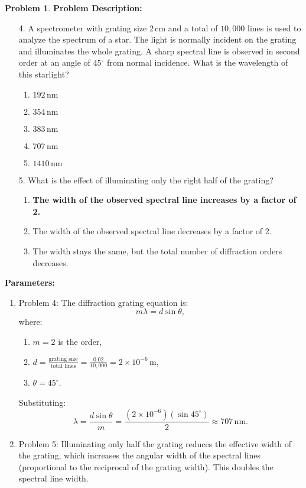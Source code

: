 \documentclass[12pt]{article}
\theoremstyle{definition} %
\newtheorem{problem}{Problem}
\theoremstyle{plain} %
\begin{document}
\begin{problem}
    
\textbf{Problem Description:}

\begin{enumerate}
    \item[4.] A spectrometer with grating size \(2 \, \text{cm}\) and a total of \(10,000\) lines is used to analyze the spectrum of a star. The light is normally incident on the grating and illuminates the whole grating. A sharp spectral line is observed in second order at an angle of \(45^\circ\) from normal incidence. What is the wavelength of this starlight?
    \begin{enumerate}
        \item \(192 \, \text{nm}\)
        \item \(354 \, \text{nm}\)
        \item \(383 \, \text{nm}\)
        \item \textbf{\(707 \, \text{nm}\)}
        \item \(1410 \, \text{nm}\)
    \end{enumerate}

    \item[5.] What is the effect of illuminating only the right half of the grating?
    \begin{enumerate}
        \item \textbf{The width of the observed spectral line increases by a factor of 2.}
        \item The width of the observed spectral line decreases by a factor of 2.
        \item The width stays the same, but the total number of diffraction orders decreases.
    \end{enumerate}
\end{enumerate}

\textbf{Parameters:}
\begin{enumerate}
    \item Problem 4: The diffraction grating equation is:
    $$
    m\lambda = d\sin\theta,
    $$
    where:
    \begin{enumerate}
        \item \(m = 2\) is the order,
        \item \(d = \frac{\text{grating size}}{\text{total lines}} = \frac{0.02}{10,000} = 2 \times 10^{-6} \, \text{m}\),
        \item \(\theta = 45^\circ\).
    \end{enumerate}
    Substituting:
    $$
    \lambda = \frac{d\sin\theta}{m} = \frac{(2 \times 10^{-6})(\sin 45^\circ)}{2} \approx 707 \, \text{nm}.
    $$
    \item Problem 5: Illuminating only half the grating reduces the effective width of the grating, which increases the angular width of the spectral lines (proportional to the reciprocal of the grating width). This doubles the spectral line width.
\end{enumerate}


\end{problem}
\end{document}
